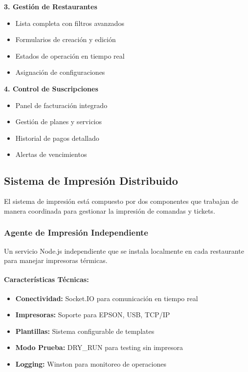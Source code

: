 \documentclass[12pt,a4paper]{article}
\begin{document}
\textbf{3. Gestión de Restaurantes}
\begin{itemize}
    \item Lista completa con filtros avanzados
    \item Formularios de creación y edición
    \item Estados de operación en tiempo real
    \item Asignación de configuraciones
\end{itemize}

\textbf{4. Control de Suscripciones}
\begin{itemize}
    \item Panel de facturación integrado
    \item Gestión de planes y servicios
    \item Historial de pagos detallado
    \item Alertas de vencimientos
\end{itemize}

\subsection{Sistema de Impresión Distribuido}

El sistema de impresión está compuesto por dos componentes que trabajan de manera coordinada para gestionar la impresión de comandas y tickets.

\subsubsection{Agente de Impresión Independiente}

Un servicio Node.js independiente que se instala localmente en cada restaurante para manejar impresoras térmicas.

\paragraph{Características Técnicas:}
\begin{itemize}
    \item \textbf{Conectividad:} Socket.IO para comunicación en tiempo real
    \item \textbf{Impresoras:} Soporte para EPSON, USB, TCP/IP
    \item \textbf{Plantillas:} Sistema configurable de templates
    \item \textbf{Modo Prueba:} DRY\_RUN para testing sin impresora
    \item \textbf{Logging:} Winston para monitoreo de operaciones
\end{itemize}
\end{document}
